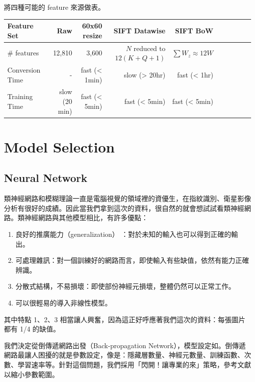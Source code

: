 將四種可能的 feature 來源做表。
\begin{table}[htb]
\centering
\begin{threeparttable}
    \begin{tabular}{lrrrrrrrrr}
        \toprule
        Feature Set     & Raw           & 60x60 resize  & SIFT Datawise              & SIFT BoW \\
        \midrule
        \# features     & 12,810        & 3,600         & $N$ reduced to $12(K+Q+1)$ & $\sum W_z \approx 12W$\\
        Conversion Time & -             & fast (< 1min) & slow (> 20hr)              & fast (< 1hr)\\
        Training Time   & slow (20 min) & fast (< 5min) & fast (< 5min)              & fast (< 5min)\\
        \bottomrule
    \end{tabular}
\end{threeparttable}
\end{table}


\section{Model Selection}
\subsection*{Neural Network}


類神經網路和模糊理論一直是電腦視覺的領域裡的資優生，在指紋識別、衛星影像分析有很好的成績。因此當我們拿到這次的資料，很自然的就會想試試看類神經網路。類神經網路與其他模型相比，有許多優點：
\begin{enumerate}[itemsep=-1ex]
\item 良好的推廣能力（generalization） ：對於未知的輸入也可以得到正確的輸出。
\item 可處理雜訊：對一個訓練好的網路而言，即使輸入有些缺值，依然有能力正確辨識。
\item 分散式結構，不易損壞：即使部份神經元損壞，整體仍然可以正常工作。
\item 可以很輕易的導入非線性模型。
\end{enumerate}
其中特點 1、2、3 相當讓人興奮，因為這正好呼應著我們這次的資料：每張圖片都有 1/4 的缺值。

我們決定從倒傳遞網路出發（Back-propagation Network），模型設定如。倒傳遞網路最讓人困擾的就是參數設定，像是：隱藏層數量、神經元數量、訓練函數、次數、學習速率等。針對這個問題，我們採用「閃開！讓專業的來」策略，參考文獻以縮小參數範圍。

